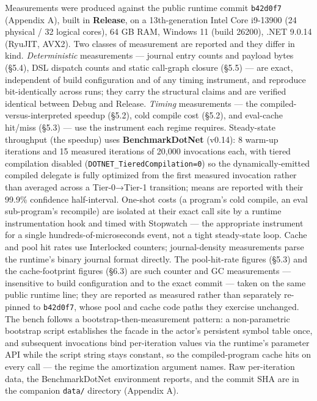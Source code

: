 \documentclass[
]{article}
\let\origtexttt\texttt%
\renewcommand{\texttt}[1]{\origtexttt{\seqsplit{#1}}}%
\let\texttt\origtexttt%
\begin{document}
Measurements were produced against the public runtime commit
\texttt{b42d0f7} (Appendix A), built in \textbf{Release}, on a
13th-generation Intel Core i9-13900 (24 physical / 32 logical cores), 64
GB RAM, Windows 11 (build 26200), .NET 9.0.14 (RyuJIT, AVX2). Two
classes of measurement are reported and they differ in kind.
\emph{Deterministic} measurements --- journal entry counts and payload
bytes (§5.4), DSL dispatch counts and static call-graph closure (§5.5)
--- are exact, independent of build configuration and of any timing
instrument, and reproduce bit-identically across runs; they carry the
structural claims and are verified identical between Debug and Release.
\emph{Timing} measurements --- the compiled-versus-interpreted speedup
(§5.2), cold compile cost (§5.2), and eval-cache hit/miss (§5.3) --- use
the instrument each regime requires. Steady-state throughput (the
speedup) uses \textbf{BenchmarkDotNet} (v0.14): 8 warm-up iterations and
15 measured iterations of 20,000 invocations each, with tiered
compilation disabled (\texttt{DOTNET\_TieredCompilation=0}) so the
dynamically-emitted compiled delegate is fully optimized from the first
measured invocation rather than averaged across a Tier-0→Tier-1
transition; means are reported with their 99.9\% confidence
half-interval. One-shot costs (a program's cold compile, an eval
sub-program's recompile) are isolated at their exact call site by a
runtime instrumentation hook and timed with Stopwatch --- the
appropriate instrument for a single hundreds-of-microseconds event, not
a tight steady-state loop. Cache and pool hit rates use Interlocked
counters; journal-density measurements parse the runtime's binary
journal format directly. The pool-hit-rate figures (§5.3) and the
cache-footprint figures (§6.3) are such counter and GC measurements ---
insensitive to build configuration and to the exact commit --- taken on
the same public runtime line; they are reported as measured rather than
separately re-pinned to \texttt{b42d0f7}, whose pool and cache code
paths they exercise unchanged. The bench follows a
bootstrap-then-measurement pattern: a non-parametric bootstrap script
establishes the facade in the actor's persistent symbol table once, and
subsequent invocations bind per-iteration values via the runtime's
parameter API while the script string stays constant, so the
compiled-program cache hits on every call --- the regime the
amortization argument names. Raw per-iteration data, the BenchmarkDotNet
environment reports, and the commit SHA are in the companion
\texttt{data/} directory (Appendix A).
\end{document}
